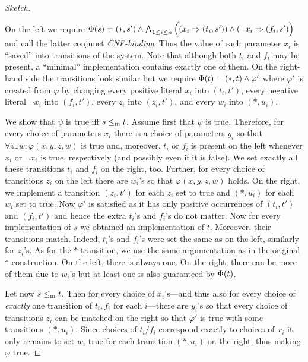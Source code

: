 \begin{proof}[Sketch]
\begin{center}
\end{center}

On the left we require $\mathrm{\Phi}(s) = (*,s')\wedge \bigwedge_{1 \le i \le n} 
\Big((x_i \Rightarrow (t_i,s')) \wedge (\neg x_i \Rightarrow (f_i,s')\Big)$ and
call the latter conjunct \emph{CNF-binding}. 
Thus the value of each parameter $x_i$ is ``saved'' into transitions of the system. Note that although both $t_i$ and $f_i$ may be present, a ``minimal'' implementation contains exactly one of them. On the right-hand side 
the transitions look similar but we require
$\mathrm{\Phi}(t) = (*,t)\wedge\varphi'$ %
where $\varphi'$ is created from $\varphi$ by changing
every positive literal $x_i$ into $(t_i,t')$,
every negative literal $\neg x_i$ into $(f_i,t')$,
every $z_i$ into $(z_i,t')$, and
every $w_i$ into $(*,u_i)$.

We show that $\psi$ is true iff $s\le_\mathrm m t$. Assume first that $\psi$ is true. 
Therefore, for every choice of parameters $x_i$ there is a choice of parameters $y_i$ so that $\forall z \exists w : \varphi(x,y,z,w)$ is true and, moreover, $t_i$ or $f_i$ is present on the left whenever $x_i$ or $\neg x_i$ is true, respectively (and possibly even if it is false). We set exactly all these transitions $t_i$ and $f_i$ on the right, too. Further, for every choice of transitions $z_i$ on the left there are $w_i$'s so that $\varphi(x,y,z,w)$ holds. On the right, we implement a transition $(z_i,t')$ for each $z_i$ set to true and $(*,u_i)$ for each $w_i$ set to true. Now $\varphi'$ is satisfied 
as it has only positive occurrences of $(t_i,t')$
and $(f_i,t')$ and hence the extra $t_i$'s and $f_i$'s do not matter. 
Now for every implementation of $s$ we obtained an implementation of $t$. Moreover, their transitions match. Indeed, $t_i$'s and $f_i$'s were set the same as on the left, similarly for $z_i$'s. As for the $*$-transition, we use the same argumentation as in the original $*$-construction. On the left, there is always one. On the right, there can be more of them due to $w_i$'s but at least one is also guaranteed by $\mathrm{\Phi}(t)$.

Let now $s\le_\mathrm m t$. Then for every choice of $x_i$'s---and thus also for every choice of \emph{exactly} one transition of $t_i,f_i$ for each $i$---there are $y_i$'s so that every choice of transitions $z_i$ can be matched on the right so that $\varphi'$ is true with some transitions $(*,u_i)$. Since choices of $t_i/f_i$ correspond exactly to choices of $x_i$ it only remains to set $w_i$ true for each transition $(*,u_i)$ on the right, thus making $\varphi$ true.

\end{proof}


